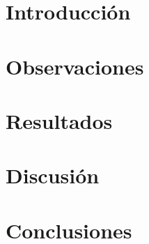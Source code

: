 \documentclass[fleqn,10pt]{SelfArx} %
\affiliation{\textsuperscript{1}\textit{Departamento, Universidad, Lugar}} %
\affiliation{\textsuperscript{2}\textit{Departamento, Universidad, Lugar}} %
\affiliation{*\textbf{Corresponding author}: uno@algo.net} %
\begin{document}
\flushbottom %
\maketitle %
\thispagestyle{empty} %

\section*{Introducción}

\section*{Observaciones}

\section*{Resultados}

\section*{Discusión}

\section*{Conclusiones}
\end{document}
